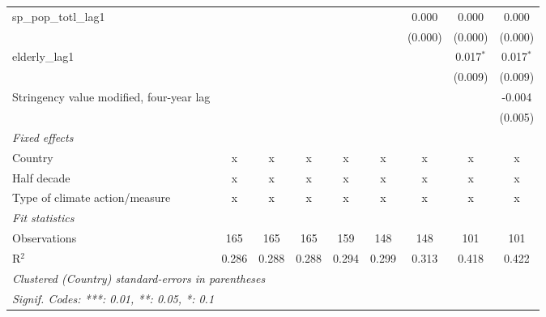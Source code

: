 \begin{tabular}{lcccccccc}
   sp\_pop\_totl\_lag1                                      &              &         &         &         &              & 0.000         & 0.000        & 0.000\\   
                                                            &              &         &         &         &              & (0.000)       & (0.000)      & (0.000)\\   
   elderly\_lag1                                            &              &         &         &         &              &               & 0.017$^{*}$  & 0.017$^{*}$\\   
                                                            &              &         &         &         &              &               & (0.009)      & (0.009)\\   
   Stringency value modified, four-year lag                 &              &         &         &         &              &               &              & -0.004\\   
                                                            &              &         &         &         &              &               &              & (0.005)\\   
   \emph{Fixed effects}\\
   Country                                                  & x            & x       & x       & x       & x            & x             & x            & x\\  
   Half decade                                              & x            & x       & x       & x       & x            & x             & x            & x\\  
   Type of climate action/measure                           & x            & x       & x       & x       & x            & x             & x            & x\\  
   \midrule \emph{Fit statistics}\\
   Observations                                             & 165          & 165     & 165     & 159     & 148          & 148           & 101          & 101\\  
   R$^2$                                                    & 0.286        & 0.288   & 0.288   & 0.294   & 0.299        & 0.313         & 0.418        & 0.422\\  
   \midrule
   \multicolumn{9}{l}{\emph{Clustered (Country) standard-errors in parentheses}}\\
   \multicolumn{9}{l}{\emph{Signif. Codes: ***: 0.01, **: 0.05, *: 0.1}}\\
\end{tabular}
\par\endgroup



